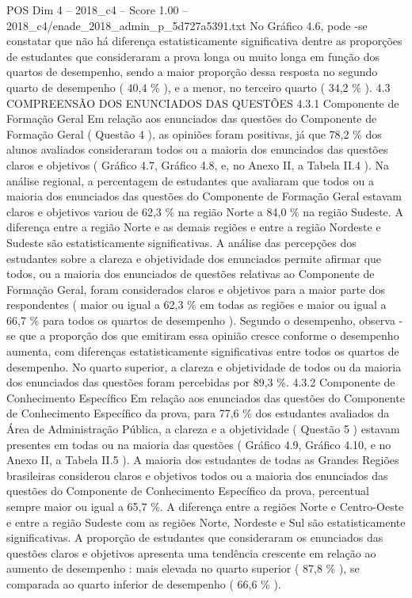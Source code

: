 \begin{textsample}{POS Dim 4 – 2018\_c4 – Score 1.00 – 2018\_c4/enade\_2018\_admin\_p\_5d727a5391.txt}
No Gráfico 4.6, pode -se constatar que não há diferença estatisticamente significativa dentre as proporções de estudantes que consideraram a prova longa ou muito longa em função dos quartos de desempenho, sendo a maior proporção dessa resposta no segundo quarto de desempenho ( 40,4 \% ), e a menor, no terceiro quarto ( 34,2 \% ). 4.3 COMPREENSÃO DOS ENUNCIADOS DAS QUESTÕES 4.3.1 Componente de Formação Geral Em relação aos enunciados das questões do Componente de Formação Geral ( Questão 4 ), as opiniões foram positivas, já que 78,2 \% dos alunos avaliados consideraram todos ou a maioria dos enunciados das questões claros e objetivos ( Gráfico 4.7, Gráfico 4.8, e, no Anexo II, a Tabela II.4 ).
Na análise regional, a percentagem de estudantes que avaliaram que todos ou a maioria dos enunciados das questões do Componente de Formação Geral estavam claros e objetivos variou de 62,3 \% na região Norte a 84,0 \% na região Sudeste.
A diferença entre a região Norte e as demais regiões e entre a região Nordeste e Sudeste são estatisticamente significativas.
A análise das percepções dos estudantes sobre a clareza e objetividade dos enunciados permite afirmar que todos, ou a maioria dos enunciados de questões relativas ao Componente de Formação Geral, foram considerados claros e objetivos para a maior parte dos respondentes ( maior ou igual a 62,3 \% em todas as regiões e maior ou igual a 66,7 \% para todos os quartos de desempenho ).
Segundo o desempenho, observa -se que a proporção dos que emitiram essa opinião cresce conforme o desempenho aumenta, com diferenças estatisticamente significativas entre todos os quartos de desempenho.
No quarto superior, a clareza e objetividade de todos ou da maioria dos enunciados das questões foram percebidas por 89,3 \%. 4.3.2 Componente de Conhecimento Específico Em relação aos enunciados das questões do Componente de Conhecimento Específico da prova, para 77,6 \% dos estudantes avaliados da Área de Administração Pública, a clareza e a objetividade ( Questão 5 ) estavam presentes em todas ou na maioria das questões ( Gráfico 4.9, Gráfico 4.10, e no Anexo II, a Tabela II.5 ).
A maioria dos estudantes de todas as Grandes Regiões brasileiras considerou claros e objetivos todos ou a maioria dos enunciados das questões do Componente de Conhecimento Específico da prova, percentual sempre maior ou igual a 65,7 \%.
A diferença entre a regiões Norte e Centro-Oeste e entre a região Sudeste com as regiões Norte, Nordeste e Sul são estatisticamente significativas.
A proporção de estudantes que consideraram os enunciados das questões claros e objetivos apresenta uma tendência crescente em relação ao aumento de desempenho : mais elevada no quarto superior ( 87,8 \% ), se comparada ao quarto inferior de desempenho ( 66,6 \% ).

\end{textsample}
